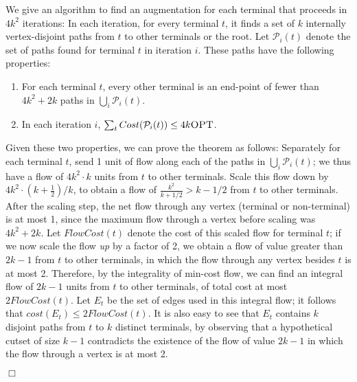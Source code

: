 \documentclass[11pt]{article}
\newcommand{\opt}{\text{\sc OPT}}
\newenvironment{proofof}[1]{\smallskip\noindent{\bf Proof of #1:}}{\hspace*{\fill}$\Box$\par}
\def\script#1{\mathcal{#1}}
\begin{document}
\begin{proofof}{Theorem~\ref{thm:kconnAug}}
  \iffalse
  An optimal solution contains an augmentation for each terminal, and
  so for each terminal $t$, $AugCost(t) \le \opt$. Hence, we may
  assume that there are at least $8k$ terminals, or we are done
  immediately.
  \fi
  We give an algorithm to find an augmentation for each terminal that
  proceeds in $4k^2$ iterations: In each iteration, for every terminal
  $t$, it finds a set of $k$ internally vertex-disjoint paths from $t$
  to other terminals or the root. Let $\script{P}_i(t)$ denote the set
  of paths found for terminal $t$ in iteration $i$. These paths have
  the following properties:
  \begin{enumerate}
    \item For each terminal $t$, every other terminal is an end-point
      of fewer than $4k^2 + 2k$ paths in $\bigcup_i \script{P}_i(t)$.
      
    \item In each iteration $i$, $\sum_t Cost(\script{P}_i(t)) \le 4k
      \opt$.
  \end{enumerate}

  Given these two properties, we can prove the theorem as follows:
  Separately for each terminal $t$, send 1 unit of flow along each of
  the paths in $\bigcup_i \script{P}_i(t)$; we thus have a flow of
  $4k^2 \cdot k$ units from $t$ to other terminals. Scale this flow
  down by $4k^2 \cdot (k+\frac{1}{2})/k$, to obtain a flow of
  $\frac{k^2}{k + 1/2} > k-1/2$ from $t$ to other terminals.  After
  the scaling step, the net flow through any vertex (terminal or
  non-terminal) is at most 1, since the maximum flow through a vertex
  before scaling was $4k^2 + 2k$. Let $FlowCost(t)$ denote the cost of
  this scaled flow for terminal $t$; if we now scale the flow
  \emph{up} by a factor of 2, we obtain a flow of value greater than
  $2k-1$ from $t$ to other terminals, in which the flow through any
  vertex besides $t$ is at most 2. Therefore, by the integrality of
  min-cost flow, we can find an integral flow of $2k-1$ units from $t$
  to other terminals, of total cost at most $2 FlowCost(t)$. Let $E_t$
  be the set of edges used in this integral flow; it follows that
  $cost(E_t) \le 2FlowCost(t)$. It is also easy to see that $E_t$
  contains $k$ disjoint paths from $t$ to $k$ distinct terminals, by
  observing that a hypothetical cutset of size $k-1$ contradicts the
  existence of the flow of value $2k-1$ in which the flow through a
  vertex is at most 2.


\end{proofof}
\end{document}

